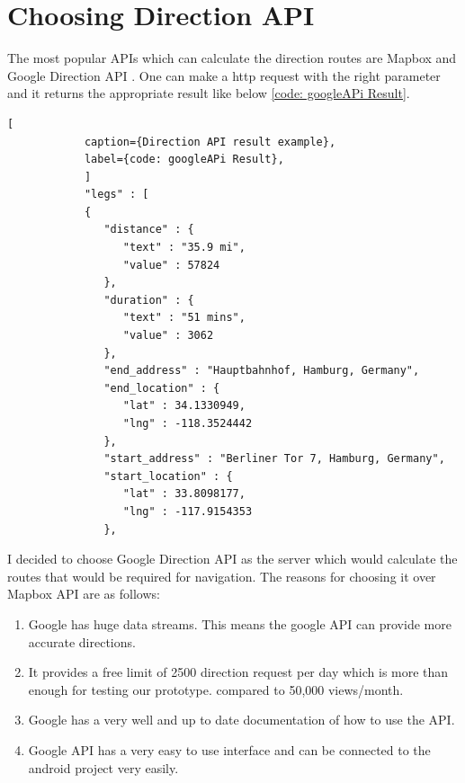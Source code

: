     \section{Choosing Direction API}  
        The most popular APIs which can calculate the direction routes are Mapbox \cite{mapbox} 
        and Google Direction API \cite{googleDirecAPI}. One can make a http request with the 
        right parameter and it returns the appropriate result like below \ref{code: googleAPi Result}.
        \begin{lstlisting}[
            caption={Direction API result example}, 
            label={code: googleAPi Result},
            ]
            "legs" : [
            {
               "distance" : {
                  "text" : "35.9 mi",
                  "value" : 57824
               },
               "duration" : {
                  "text" : "51 mins",
                  "value" : 3062
               },
               "end_address" : "Hauptbahnhof, Hamburg, Germany",
               "end_location" : {
                  "lat" : 34.1330949,
                  "lng" : -118.3524442
               },
               "start_address" : "Berliner Tor 7, Hamburg, Germany",
               "start_location" : {
                  "lat" : 33.8098177,
                  "lng" : -117.9154353
               },  
        \end{lstlisting}
    
        I decided to choose Google Direction API as the server which
        would calculate the routes that would be required for navigation.
        The reasons for choosing it over Mapbox API are as follows:

        \begin{enumerate}  
            \item 
                Google has huge data streams. This means the google API can provide more
                accurate directions.
            \item
                It provides a free limit of 2500 direction request per day which is more than enough for testing our prototype.
                compared to  50,000 views/month.
            \item
                Google has a very well and up to date documentation of how to use the API.  
            \item
                Google API has a very easy to use interface and can be connected to the android
                project very easily.
        \end{enumerate}



